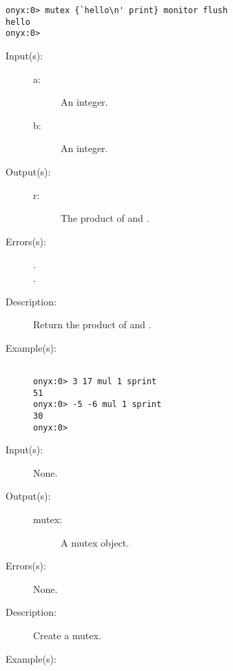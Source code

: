 \begin{description}
\begin{description}
\begin{verbatim}
onyx:0> mutex {`hello\n' print} monitor flush
hello
onyx:0>
		\end{verbatim}
	\end{description}
\label{systemdict:mul}
\item[{\onyxop{a b}{mul}{r}}: ]
	\begin{description}\item[]
	\item[Input(s): ]
		\begin{description}\item[]
		\item[a: ]
			An integer.
		\item[b: ]
			An integer.
		\end{description}
	\item[Output(s): ]
		\begin{description}\item[]
		\item[r: ]
			The product of  and .
		\end{description}
	\item[Errors(s): ]
		\begin{description}\item[]
		\item[.]
		\item[.]
		\end{description}
	\item[Description: ]
		Return the product of  and .
	\item[Example(s): ]\begin{verbatim}

onyx:0> 3 17 mul 1 sprint
51
onyx:0> -5 -6 mul 1 sprint
30
onyx:0>
		\end{verbatim}
	\end{description}
\label{systemdict:mutex}
\item[{\onyxop{--}{mutex}{mutex}}: ]
	\begin{description}\item[]
	\item[Input(s): ] None.
	\item[Output(s): ]
		\begin{description}\item[]
		\item[mutex: ]
			A mutex object.
		\end{description}
	\item[Errors(s): ] None.
	\item[Description: ]
		Create a mutex.
	\item[Example(s): ]\begin{verbatim}


\end{verbatim}
\end{description}
\end{description}
